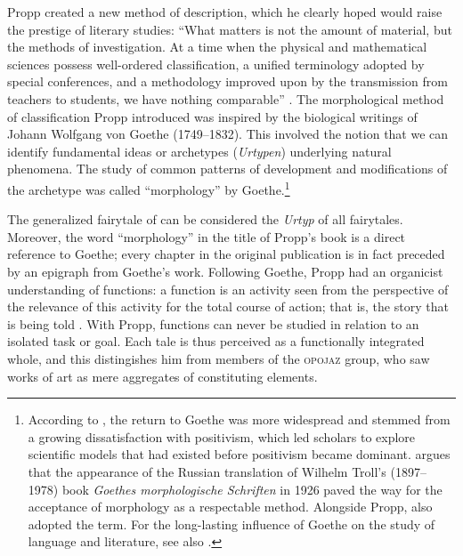 \documentclass[output=paper]{langscibook}
\begin{document}
Propp created a new method of description, which he clearly hoped would raise the prestige of literary studies: ``What matters is not the amount of material, but the methods of investigation. At a time when the physical and mathematical sciences possess well-ordered classification, a unified terminology adopted by special conferences, and a methodology improved upon by the transmission from teachers to students, we have nothing comparable'' \citep[4]{Propp1968}. The morphological method of classification Propp introduced was inspired by the biological writings of Johann Wolfgang von Goethe (1749--1832). This involved the notion that we can identify fundamental ideas or archetypes (\emph{Urtypen}) underlying natural phenomena. The study of common patterns of development and modifications of the archetype was called ``morphology'' by Goethe.\footnote{According to \citet[257--258]{Steiner1984}, the return to Goethe was more widespread and stemmed from a growing dissatisfaction with positivism, which led scholars to explore scientific models that had existed before positivism became dominant. \citet[13]{Oppel1947} argues that the appearance of the Russian translation of Wilhelm Troll's (1897--1978) book \emph{Goethes morphologische Schriften} in 1926 paved the way for the acceptance of morphology as a respectable method. Alongside Propp, \citet{Petrovskij1927} also adopted the term. For the long-lasting influence of Goethe on the study of language and literature, see also \citet{Cassirer1945}.}

The generalized fairytale of  can be considered the \emph{Urtyp} of all fairytales. Moreover, the word ``morphology'' in the title of Propp's book is a direct reference to Goethe; every chapter in the original publication is in fact preceded by an epigraph from Goethe's work. Following Goethe, Propp had an organicist understanding of functions: a function is an activity seen from the perspective of the relevance of this activity for the total course of action; that is, the story that is being told \citep[84]{Steiner1984}. With Propp, functions can never be studied in relation to an isolated task or goal. Each tale is thus perceived as a functionally integrated whole, and this distingishes him from members of the \textsc{opojaz} group, who saw works of art as mere aggregates of constituting elements.
\end{document}

